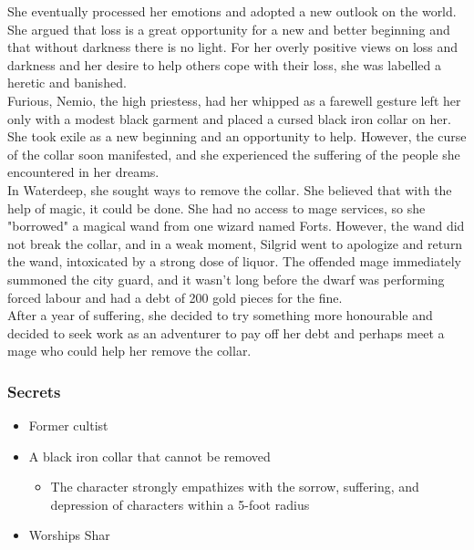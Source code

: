 \documentclass[10pt,onecolumn,twoside,openany,bg=full,layout=true]{dndbook}
\begin{document}
She eventually processed her emotions and adopted a new outlook on the world.
She argued that loss is a great opportunity for a new and better beginning and that without darkness there is no light.
For her overly positive views on loss and darkness and her desire to help others cope with their loss,
she was labelled a heretic and banished.\\

Furious, Nemio, the high priestess, had her whipped as a farewell gesture left her only with a modest black garment
and placed a cursed black iron collar on her.\\

She took exile as a new beginning and an opportunity to help.
However, the curse of the collar soon manifested, and she experienced the suffering of the people she encountered in her dreams.\\

In Waterdeep, she sought ways to remove the collar.
She believed that with the help of magic, it could be done.
She had no access to mage services, so she "borrowed" a magical wand from one wizard named Forts.
However, the wand did not break the collar, and in a weak moment, Silgrid went to apologize and return the wand,
intoxicated by a strong dose of liquor.
The offended mage immediately summoned the city guard, and it wasn't long before the dwarf was performing forced labour
and had a debt of 200 gold pieces for the fine.\\

After a year of suffering, she decided to try something more honourable and decided to seek work as an adventurer
to pay off her debt and perhaps meet a mage who could help her remove the collar.\\

\subsubsection{Secrets}
\begin{itemize}
  \item Former cultist
  \item A black iron collar that cannot be removed
  \begin{itemize}
    \item The character strongly empathizes with the sorrow, suffering, and depression of characters within a 5-foot radius
  \end{itemize}
\item Worships Shar
\end{itemize}
\end{document}
